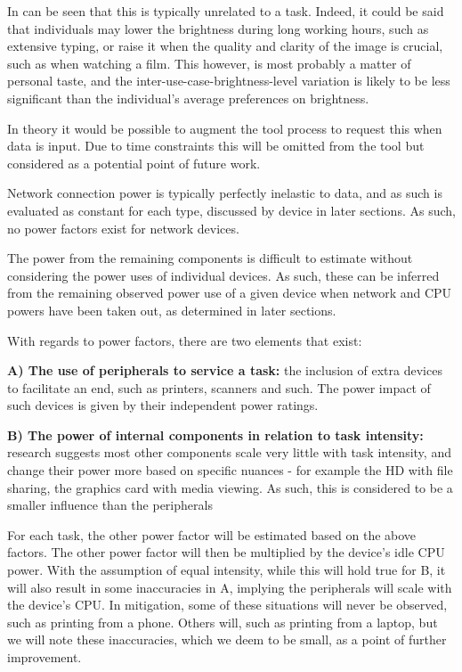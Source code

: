 \documentclass[conference]{IEEEtran}
\begin{document}
In can be seen that this is typically unrelated to a task. Indeed, it
could be said that individuals may lower the brightness during long
working hours, such as extensive typing, or raise it when the quality
and clarity of the image is crucial, such as when watching a
film. This however, is most probably a matter of personal taste, and
the inter-use-case-brightness-level variation is likely to be less
significant than the individual’s average preferences on brightness.

In theory it would be possible to augment the tool process to request
this when data is input. Due to time constraints this will be omitted
from the tool but considered as a potential point of future work.


Network connection power is typically perfectly inelastic to data, and
as such is evaluated as constant for each type, discussed by device in
later sections. As such, no power factors exist for network devices.


The power from the remaining components is difficult to estimate
without considering the power uses of individual devices. As such,
these can be inferred from the remaining observed power use of a given
device when network and CPU powers have been taken out, as determined
in later sections.

With regards to power factors, there are two elements that exist:

{\textbf{A) The use of peripherals to service a task:}} the inclusion of extra
devices to facilitate an end, such as printers, scanners and such. The
power impact of such devices is given by their independent power
ratings.

{\textbf{B) The power of internal components in relation to task
    intensity:}} research suggests most other components scale very little with task
intensity, and change their power more based on specific nuances - for
example the HD with file sharing, the graphics card with media
viewing. As such, this is considered to be a smaller influence than
the peripherals

For each task, the other power factor will be estimated based on the
above factors. The other power factor will then be multiplied by the
device’s idle CPU power. With the assumption of equal intensity, while
this will hold true for B, it will also result in some inaccuracies in
A, implying the peripherals will scale with the device’s CPU. In
mitigation, some of these situations will never be observed, such as
printing from a phone. Others will, such as printing from a laptop,
but we will note these inaccuracies, which we deem to be small, as a
point of further improvement.
\end{document}
